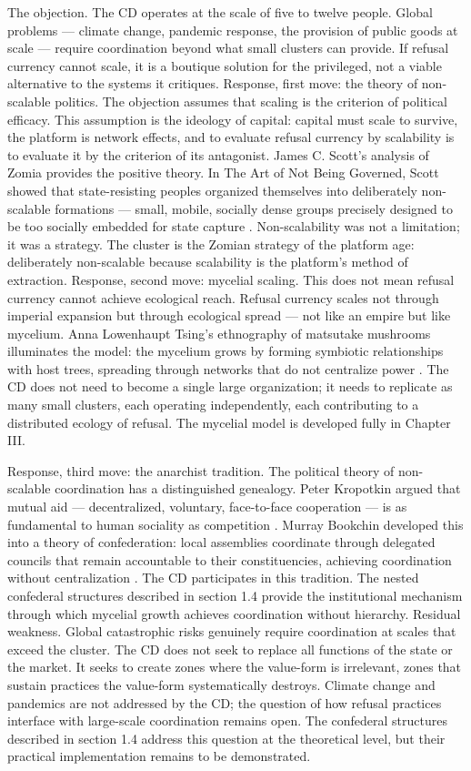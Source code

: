 The objection. The CD operates at the scale of five to twelve people. Global problems — climate change, pandemic response, the provision of public goods at scale — require coordination beyond what small clusters can provide. If refusal currency cannot scale, it is a boutique solution for the privileged, not a viable alternative to the systems it critiques. Response, first move: the theory of non-scalable politics. The objection assumes that scaling is the criterion of political efficacy. This assumption is the ideology of capital: capital must scale to survive, the platform is network effects, and to evaluate refusal currency by scalability is to evaluate it by the criterion of its antagonist. James C. Scott’s analysis of Zomia provides the positive theory. In The Art of Not Being Governed, Scott showed that state-resisting peoples organized themselves into deliberately non-scalable formations — small, mobile, socially dense groups precisely designed to be too socially embedded for state capture \cite{scott_2009}. Non-scalability was not a limitation; it was a strategy. The cluster is the Zomian strategy of the platform age: deliberately non-scalable because scalability is the platform’s method of extraction. Response, second move: mycelial scaling. This does not mean refusal currency cannot achieve ecological reach. Refusal currency scales not through imperial expansion but through ecological spread — not like an empire but like mycelium. Anna Lowenhaupt Tsing’s ethnography of matsutake mushrooms illuminates the model: the mycelium grows by forming symbiotic relationships with host trees, spreading through networks that do not centralize power \cite{tsing_2015}. The CD does not need to become a single large organization; it needs to replicate as many small clusters, each operating independently, each contributing to a distributed ecology of refusal. The mycelial model is developed fully in Chapter III.

Response, third move: the anarchist tradition. The political theory of non-scalable coordination has a distinguished genealogy. Peter Kropotkin argued that mutual aid — decentralized, voluntary, face-to-face cooperation — is as fundamental to human sociality as competition \cite{kropotkin_1902}. Murray Bookchin developed this into a theory of confederation: local assemblies coordinate through delegated councils that remain accountable to their constituencies, achieving coordination without centralization \cite{bookchin_1991}. The CD participates in this tradition. The nested confederal structures described in section 1.4 provide the institutional mechanism through which mycelial growth achieves coordination without hierarchy. Residual weakness. Global catastrophic risks genuinely require coordination at scales that exceed the cluster. The CD does not seek to replace all functions of the state or the market. It seeks to create zones where the value-form is irrelevant, zones that sustain practices the value-form systematically destroys. Climate change and pandemics are not addressed by the CD; the question of how refusal practices interface with large-scale coordination remains open. The confederal structures described in section 1.4 address this question at the theoretical level, but their practical implementation remains to be demonstrated.

